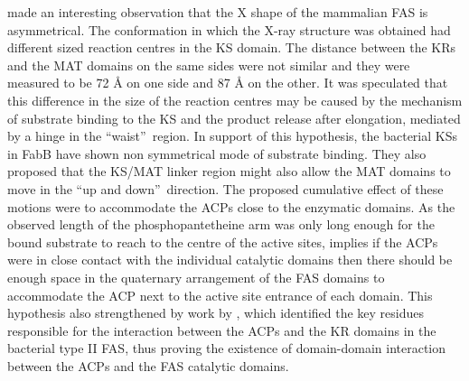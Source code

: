 		\textcite{Maier2006} made an interesting observation that the X shape of the mammalian FAS is asymmetrical. The conformation in which the X-ray structure was obtained had different sized reaction centres in the KS domain. The distance between the KRs and the MAT domains on the same sides were not similar and they were measured to be 72 \AA{} on one side and 87 \AA{} on the other. It was speculated that this difference in the size of the reaction centres may be caused by the mechanism of substrate binding to the KS and the product release after elongation, mediated by a hinge in the \textquotedblleft waist\textquotedblright \ region. In support of this hypothesis, the bacterial KSs in FabB have shown non symmetrical mode of substrate binding. They also proposed that the KS/MAT linker region might also allow the MAT domains to  move in the \textquotedblleft up and down\textquotedblright \ direction. The proposed cumulative effect of these motions were to accommodate the ACPs close to the enzymatic domains. As the observed length of the phosphopantetheine arm was only long enough for the bound substrate to reach to the centre of the active sites, implies if the ACPs were in close contact with the individual catalytic domains then there should be enough space in the quaternary arrangement of the FAS domains to accommodate the ACP next to the active site entrance of each domain.  This hypothesis also strengthened by work by \textcite{Zhang2003}, which identified the key residues responsible for the interaction between the ACPs and the KR domains in the bacterial type II FAS, thus proving the existence of domain-domain interaction between the ACPs and the FAS catalytic domains.

